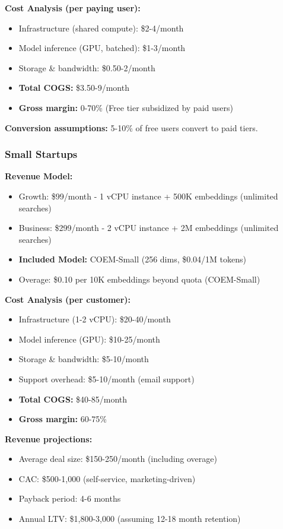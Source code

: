 \textbf{Cost Analysis (per paying user):}
\begin{itemize}[noitemsep]
    \item Infrastructure (shared compute): \$2-4/month
    \item Model inference (GPU, batched): \$1-3/month
    \item Storage \& bandwidth: \$0.50-2/month
    \item \textbf{Total COGS:} \$3.50-9/month
    \item \textbf{Gross margin:} 0-70\% (Free tier subsidized by paid users)
\end{itemize}

\textbf{Conversion assumptions:} 5-10\% of free users convert to paid tiers.

\subsubsection{Small Startups}

\textbf{Revenue Model:}
\begin{itemize}[noitemsep]
    \item Growth: \$99/month - 1 vCPU instance + 500K embeddings (unlimited searches)
    \item Business: \$299/month - 2 vCPU instance + 2M embeddings (unlimited searches)
    \item \textbf{Included Model:} COEM-Small (256 dims, \$0.04/1M tokens)
    \item Overage: \$0.10 per 10K embeddings beyond quota (COEM-Small)
\end{itemize}

\textbf{Cost Analysis (per customer):}
\begin{itemize}[noitemsep]
    \item Infrastructure (1-2 vCPU): \$20-40/month
    \item Model inference (GPU): \$10-25/month
    \item Storage \& bandwidth: \$5-10/month
    \item Support overhead: \$5-10/month (email support)
    \item \textbf{Total COGS:} \$40-85/month
    \item \textbf{Gross margin:} 60-75\%
\end{itemize}

\textbf{Revenue projections:}
\begin{itemize}[noitemsep]
    \item Average deal size: \$150-250/month (including overage)
    \item CAC: \$500-1,000 (self-service, marketing-driven)
    \item Payback period: 4-6 months
    \item Annual LTV: \$1,800-3,000 (assuming 12-18 month retention)
\end{itemize}

